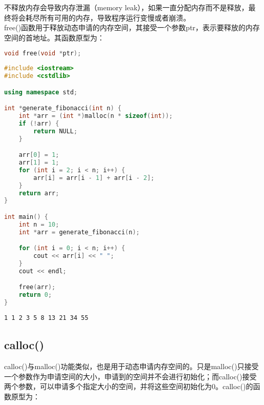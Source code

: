 不释放内存会导致内存泄漏（memory leak），如果一直分配内存而不是释放，最终将会耗尽所有可用的内存，导致程序运行变慢或者崩溃。\\

free()函数用于释放动态申请的内存空间，其接受一个参数ptr，表示要释放的内存空间的首地址。其函数原型为：

\vspace{-0.5cm}

\begin{lstlisting}[language=C++]
void free(void *ptr);
\end{lstlisting}

\vspace{0.5cm}


\begin{lstlisting}[language=C++]
#include <iostream>
#include <cstdlib>

using namespace std;

int *generate_fibonacci(int n) {
    int *arr = (int *)malloc(n * sizeof(int));
    if (!arr) {
        return NULL;
    }

    arr[0] = 1;
    arr[1] = 1;
    for (int i = 2; i < n; i++) {
        arr[i] = arr[i - 1] + arr[i - 2];
    }
    return arr;
}

int main() {
    int n = 10;
    int *arr = generate_fibonacci(n);

    for (int i = 0; i < n; i++) {
        cout << arr[i] << " ";
    }
    cout << endl;

    free(arr);
    return 0;
}
\end{lstlisting}

\begin{tcolorbox}
    \begin{verbatim}
1 1 2 3 5 8 13 21 34 55
	\end{verbatim}
\end{tcolorbox}

\vspace{0.5cm}

\subsection{calloc()}

calloc()与malloc()功能类似，也是用于动态申请内存空间的。只是malloc()只接受一个参数作为申请空间的大小，申请到的空间并不会进行初始化；而calloc()接受两个参数，可以申请多个指定大小的空间，并将这些空间初始化为0。calloc()的函数原型为：

